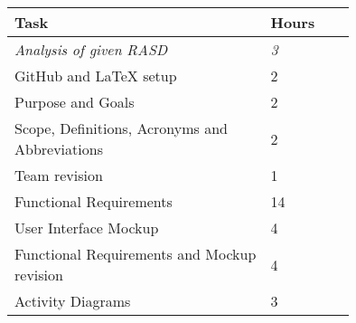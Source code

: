 \smallskip
\begin{center}
\begin{tabular}{ | p{0.75\linewidth} | l | }
  \hline
    \textbf{Task} & \textbf{Hours }\\ \hline
    \textit{Analysis of given RASD} & \textit{3} \\ \hline
    GitHub and LaTeX setup & 2 \\ \hline
    Purpose and Goals & 2 \\ \hline
    Scope, Definitions, Acronyms and Abbreviations & 2 \\ \hline
    Team revision & 1 \\ \hline
    Functional Requirements & 14 \\ \hline
    User Interface Mockup & 4 \\ \hline
    Functional Requirements and Mockup revision & 4 \\ \hline
    Activity Diagrams & 3 \\ \hline
\end{tabular}
\end{center}

\clearpage
